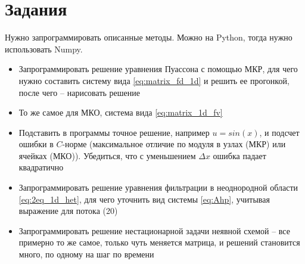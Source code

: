 \documentclass[a4paper, 11pt]{article}
\begin{document}
\section{Задания}
Нужно запрограммировать описанные методы. Можно на Python, тогда нужно использовать Numpy.
\begin{itemize}
	\item Запрограммировать решение уравнения Пуассона с помощью МКР, для чего нужно составить систему вида \eqref{eq:matrix_fd_1d} и решить ее прогонкой, после чего -- нарисовать решение
	\item То же самое для МКО, система вида \eqref{eq:matrix_1d_fv}
	\item Подставить в программы точное решение, например $u = sin(x)$, и подсчет ошибки в $C$-норме (максимальное отличие по модуля в узлах (МКР) или ячейках (МКО)). Убедиться, что с уменьшением $\Delta x$ ошибка падает квадратично
	\item Запрограммировать решение уравнения фильтрации в неоднородной области \eqref{eq:2eq_1d_het}, для чего уточнить вид системы \eqref{eq:Ahp}, учитывая выражение для потока (20)
	\item Запрограммировать решение нестационарной задачи неявной схемой -- все примерно то же самое, только чуть меняется матрица, и решений становится много, по одному на шаг по времени
\end{itemize}

\end{document}
